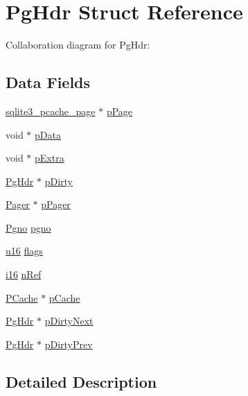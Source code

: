 \hypertarget{struct_pg_hdr}{}\section{Pg\+Hdr Struct Reference}
\label{struct_pg_hdr}


Collaboration diagram for Pg\+Hdr\+:
\subsection*{Data Fields}
\begin{DoxyCompactItemize}
\item 
\hyperlink{structsqlite3__pcache__page}{sqlite3\+\_\+pcache\+\_\+page} $\ast$ \hyperlink{struct_pg_hdr_a93dd9756d090be6aaeae1d086dbad7d9}{p\+Page}
\item 
void $\ast$ \hyperlink{struct_pg_hdr_aa92f08987c51e4eb7b92e84944ca2af3}{p\+Data}
\item 
void $\ast$ \hyperlink{struct_pg_hdr_a484f2fe7f225c408158584262bebab66}{p\+Extra}
\item 
\hyperlink{struct_pg_hdr}{Pg\+Hdr} $\ast$ \hyperlink{struct_pg_hdr_a2997dc2dc0dd03fdd59937ca5a4eef8a}{p\+Dirty}
\item 
\hyperlink{struct_pager}{Pager} $\ast$ \hyperlink{struct_pg_hdr_a916447fa61ba4e11cc93d571a66d3aaf}{p\+Pager}
\item 
\hyperlink{sqlite3_8c_aec0c653e8dd16e4639caf2f8ea54f55c}{Pgno} \hyperlink{struct_pg_hdr_a77cf3333a46c0b2e6d1614dce1a6405a}{pgno}
\item 
\hyperlink{sqlite3_8c_a20f2299e322dcbde37cb07b16910b843}{u16} \hyperlink{struct_pg_hdr_a687c73b55452210faa467db4d365a3ee}{flags}
\item 
\hyperlink{sqlite3_8c_a7b32340f65cd15f029caad258fb3355c}{i16} \hyperlink{struct_pg_hdr_ad9e2b8d24729b14017c69dcbd8f6710a}{n\+Ref}
\item 
\hyperlink{struct_p_cache}{P\+Cache} $\ast$ \hyperlink{struct_pg_hdr_a0e46130dcee42d121d035a573c45a63d}{p\+Cache}
\item 
\hyperlink{struct_pg_hdr}{Pg\+Hdr} $\ast$ \hyperlink{struct_pg_hdr_a9a8b52f1709a2099793247a8ce648e35}{p\+Dirty\+Next}
\item 
\hyperlink{struct_pg_hdr}{Pg\+Hdr} $\ast$ \hyperlink{struct_pg_hdr_a0292a09b055dcf8f39e438751dd5e433}{p\+Dirty\+Prev}
\end{DoxyCompactItemize}


\subsection{Detailed Description}


